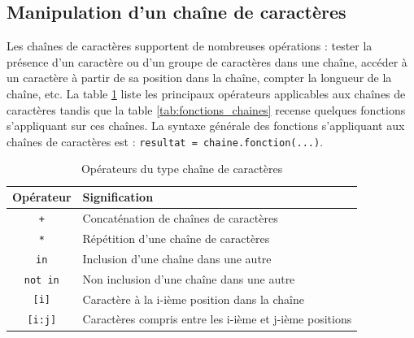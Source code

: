 \documentclass[12pt, a4paper]{article}
\begin{document}
\subsection{Manipulation d'un chaîne de caractères}
Les chaînes de caractères supportent de nombreuses opérations : tester la présence d'un caractère ou d'un groupe de caractères dans une chaîne, accéder à un caractère à partir de sa position dans la chaîne, compter la longueur de la chaîne, etc. La table \ref{tab:operateurs_chaines} liste les principaux opérateurs applicables aux chaînes de caractères tandis que la table \ref{tab:fonctions_chaines} recense quelques fonctions s'appliquant sur ces chaînes. La syntaxe générale des fonctions s'appliquant aux chaînes de caractères est : \lstinline{resultat = chaine.fonction(...)}.

\begin{table}[H]
	\begin{center}
		\begin{tabular}{|c|l|}
			\hline
			\textbf{Opérateur} & \textbf{Signification} \\
			\hline
			\lstinline{+} & Concaténation de chaînes de caractères \\
			\lstinline{*} & Répétition d'une chaîne de caractères \\
			\lstinline{in} & Inclusion d'une chaîne dans une autre \\
			\lstinline{not in} & Non inclusion d'une chaîne dans une autre \\
			\lstinline{[i]} & Caractère à la i-ième position dans la chaîne \\
			\lstinline{[i:j]} & Caractères compris entre les i-ième et j-ième positions \\
			\hline
		\end{tabular}
		\caption{Opérateurs du type chaîne de caractères}
		\label{tab:operateurs_chaines}
	\end{center}
\end{table}
\end{document}
